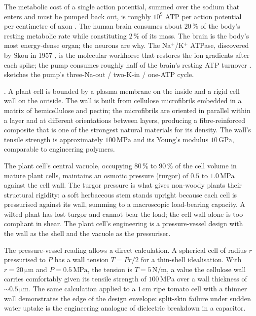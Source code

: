 The metabolic cost of a single action potential, summed over the
sodium that enters and must be pumped back out, is roughly
$10^9$ ATP per action potential per centimetre of axon
\cite{paper:v6c01-attwell-laughlin-2001}. The human brain consumes
about $20\,\%$ of the body's resting metabolic rate while constituting
$2\,\%$ of its mass. The brain is the body's most energy-dense organ;
the neurons are why. The Na$^+$/K$^+$ ATPase, discovered by Skou in
1957 \cite{paper:v6c01-skou-1957}, is the molecular workhorse that
restores the ion gradients after each spike; the pump consumes roughly
half of the brain's resting ATP turnover
\cite{paper:v6c01-erecinska-1989}. 
sketches the pump's three-Na-out / two-K-in / one-ATP cycle.



. A plant cell is bounded
by a plasma membrane on the inside and a rigid cell wall on the
outside. The wall is built from cellulose microfibrils embedded in a
matrix of hemicellulose and pectin; the microfibrils are oriented in
parallel within a layer and at different orientations between
layers, producing a fibre-reinforced composite that is one of the
strongest natural materials for its density. The wall's tensile
strength is approximately $100\,\text{MPa}$ and its Young's modulus
$10\,\text{GPa}$, comparable to engineering polymers.

The plant cell's central vacuole, occupying $80\,\%$ to $90\,\%$ of
the cell volume in mature plant cells, maintains an osmotic pressure
(turgor) of $0.5$ to $1.0\,\text{MPa}$ against the cell wall. The
turgor pressure is what gives non-woody plants their structural
rigidity: a soft herbaceous stem stands upright because each cell is
pressurised against its wall, summing to a macroscopic load-bearing
capacity. A wilted plant has lost turgor and cannot bear the load;
the cell wall alone is too compliant in shear. The plant cell's
engineering is a pressure-vessel design with the wall as the shell
and the vacuole as the pressuriser.

The pressure-vessel reading allows a direct calculation. A spherical
cell of radius $r$ pressurised to $P$ has a wall tension
$T = Pr/2$ for a thin-shell idealisation. With $r = 20\,\si{\micro\meter}$
and $P = 0.5\,\text{MPa}$, the tension is $T = 5\,\text{N}/\text{m}$,
a value the cellulose wall carries comfortably given its tensile
strength of $100\,\text{MPa}$ over a wall thickness of
$\sim 0.5\,\si{\micro\meter}$. The same calculation applied to a
$1\,\text{cm}$ ripe tomato cell with a thinner wall demonstrates the
edge of the design envelope: split-skin failure under sudden water
uptake is the engineering analogue of dielectric breakdown in a
capacitor.

